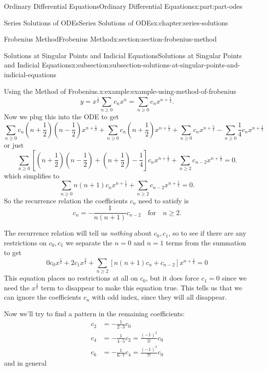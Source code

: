 \documentclass[twoside,10pt,]{book}
\numberwithin{equation}{part}
\newcommand{\amp}{&}
\begin{document}
\begin{partptx}{Ordinary Differential Equations}{}{Ordinary Differential Equations}{}{}{x:part:part-odes}
\begin{chapterptx}{Series Solutions of ODEs}{}{Series Solutions of ODEs}{}{}{x:chapter:series-solutions}
\begin{sectionptx}{Frobenius Method}{}{Frobenius Method}{}{}{x:section:section-frobenius-method}
\begin{subsectionptx}{Solutions at Singular Points and Indicial Equations}{}{Solutions at Singular Points and Indicial Equations}{}{}{x:subsection:subsection-solutions-at-singular-points-and-indicial-equations}
\begin{example}{Using the Method of Frobenius.}{x:example:example-using-method-of-frobenius}
\begin{equation*}
y = x^{\frac{1}{2}}\sum_{n\geq0}^{}c_{n}x^{n} = \sum_{n\geq0}^{}c_{n}x^{n+\frac{1}{2}}.
\end{equation*}
Now we plug this into the ODE to get%
\begin{equation*}
\sum_{n\geq0}c_{n}(n+\frac{1}{2})(n-\frac{1}{2})x^{n+\frac{1}{2}} + \sum_{n\geq0}c_{n}(n+\frac{1}{2})x^{n+\frac{1}{2}} 
+ \sum_{n\geq0}c_{n}x^{n+\frac{5}{2}} - \sum_{n\geq0}\frac{1}{4}c_{n}x^{n+\frac{1}{2}}
\end{equation*}
or just%
\begin{equation*}
\sum_{n\geq0}^{}\left[(n+\frac{1}{2})(n-\frac{1}{2})+(n+\frac{1}{2})-\frac{1}{4}\right]c_{n}x^{n+\frac{1}{2}} 
+\sum_{n\geq2}^{}c_{n-2}x^{n+\frac{1}{2}}=0.
\end{equation*}
which simplifies to%
\begin{equation*}
\sum_{n\geq0} n(n+1)c_{n}x^{n+\frac{1}{2}}+\sum_{n\geq2}c_{n-2}x^{n+\frac{1}{2}} = 0.
\end{equation*}
So the recurrence relation the coefficients \(c_{n}\) need to satisfy is%
\begin{equation*}
c_{n} = -\frac{1}{n(n+1)}c_{n-2}\quad\text{for}\quad n\geq2.
\end{equation*}
%
\par
The recurrence relation will tell us \emph{nothing} about \(c_{0},c_{1}\), so to see if there are any restrictions on \(c_{0},c_{1}\) we separate the \(n=0\) and \(n=1\) terms from the summation to get%
\begin{equation*}
0c_{0}x^{\frac{1}{2}}+2c_{1}x^{\frac{3}{2}}+\sum_{n\geq2}^{}\left[n(n+1)c_{n}+c_{n-2}\right]x^{n+\frac{1}{2}}=0
\end{equation*}
This equation places no restrictions at all on \(c_{0}\), but it does force \(c_{1} = 0\) since we need the \(x^{\frac{3}{2}}\) term to disappear to make this equation true. This tells us that we can ignore the coefficients \(c_{n}\) with odd index, since they will all disappear.%
\par
Now we'll try to find a pattern in the remaining coefficients:%
\begin{align*}
c_{2} \amp= -\frac{1}{2\cdot3}c_{0}\\
c_{4} \amp= -\frac{1}{4\cdot5}c_{2} = \frac{(-1)^{2}}{5!}c_{0}\\
c_{6} \amp= -\frac{1}{6\cdot7}c_{4} = \frac{(-1)^{3}}{7!}c_{0}
\end{align*}
and in general%
\begin{equation*}

\end{equation*}
\end{example}
\end{subsectionptx}
\end{sectionptx}
\end{chapterptx}
\end{partptx}
\end{document}
